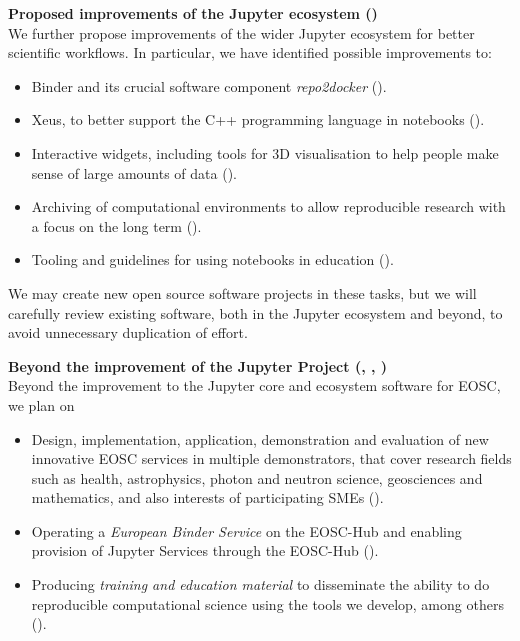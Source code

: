 \medskip
\noindent\textbf{Proposed improvements of the Jupyter ecosystem ()}\\
We further propose improvements of the wider Jupyter ecosystem for
better scientific workflows. In particular, we have identified
possible improvements to:

\begin{itemize}
  \item Binder and its crucial software component \emph{repo2docker}
    ().

  \item Xeus, to better support the C++ programming language in notebooks
    ().

  \item Interactive widgets, including tools for 3D visualisation to help
    people make sense of large amounts of data
    ().

  \item Archiving of computational environments to allow reproducible research
    with a focus on the long term ().

  \item Tooling and guidelines
    for using notebooks in education
    ().

\end{itemize}

We may create new open source software projects in these tasks,
but we will carefully review existing software, both in the
Jupyter ecosystem and beyond, to avoid unnecessary duplication of effort.

\medskip\noindent\textbf{Beyond the improvement of the Jupyter Project
  (, , )}\\
Beyond the improvement to the Jupyter core and ecosystem software for EOSC, we plan on
\begin{itemize}
\item Design, implementation, application, demonstration and
  evaluation of new innovative EOSC services
  in multiple demonstrators, that cover research fields such as
  health, astrophysics, photon and neutron science, geosciences and
  mathematics, and also interests of participating SMEs ().
\item Operating a \emph{European Binder Service} on the EOSC-Hub and
  enabling provision of Jupyter Services through the EOSC-Hub ().
\item Producing \emph{training and education material} to disseminate
  the ability to do reproducible computational science using the tools
  we develop, among others ().
\end{itemize}


